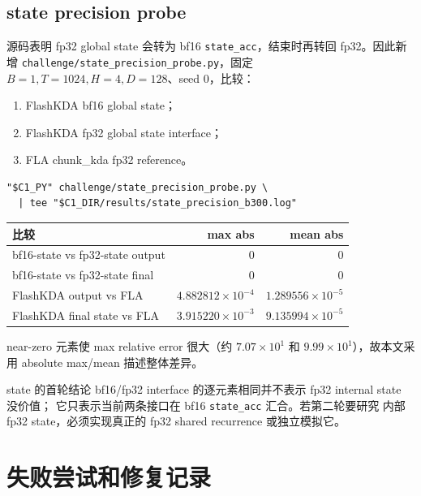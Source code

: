 \documentclass[11pt,a4paper,fontset=none]{ctexart}
\newcommand{\code}[1]{\texttt{#1}}
\begin{document}
\subsection{state precision probe}

源码表明 fp32 global state 会转为 bf16 \code{state\_acc}，结束时再转回
fp32。因此新增 \code{challenge/state\_precision\_probe.py}，固定
\(B=1,T=1024,H=4,D=128\)、seed 0，比较：

\begin{enumerate}
  \item FlashKDA bf16 global state；
  \item FlashKDA fp32 global state interface；
  \item FLA chunk\_kda fp32 reference。
\end{enumerate}

\begin{lstlisting}
"$C1_PY" challenge/state_precision_probe.py \
  | tee "$C1_DIR/results/state_precision_b300.log"
\end{lstlisting}

\begin{center}\small
\begin{tabular}{@{}lrr@{}}
\toprule
比较 & max abs & mean abs \\
\midrule
bf16-state vs fp32-state output & 0 & 0 \\
bf16-state vs fp32-state final & 0 & 0 \\
FlashKDA output vs FLA & \(4.882812\times10^{-4}\) & \(1.289556\times10^{-5}\) \\
FlashKDA final state vs FLA & \(3.915220\times10^{-3}\) & \(9.135994\times10^{-5}\) \\
\bottomrule
\end{tabular}
\end{center}

near-zero 元素使 max relative error 很大（约 \(7.07\times10^1\) 和
\(9.99\times10^1\)），故本文采用 absolute max/mean 描述整体差异。

\begin{decision}{state 的首轮结论}
bf16/fp32 interface 的逐元素相同并不表示 fp32 internal state 没价值；
它只表示当前两条接口在 bf16 \code{state\_acc} 汇合。若第二轮要研究
内部 fp32 state，必须实现真正的 fp32 shared recurrence 或独立模拟它。
\end{decision}

\section{失败尝试和修复记录}
\end{document}
